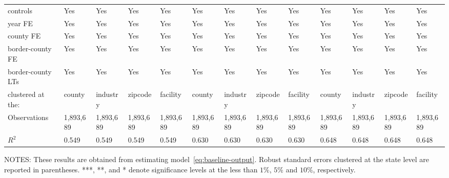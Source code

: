 \begin{table}[H]
{\begin{tabular}{@{}lllllllllllll@{}}
            controls                                                   & Yes       & Yes       & Yes       & Yes       & Yes       & Yes       & Yes       & Yes       & Yes       & Yes       & Yes       & Yes       \\
            year FE                                                    & Yes       & Yes       & Yes       & Yes       & Yes       & Yes       & Yes       & Yes       & Yes       & Yes       & Yes       & Yes       \\
            county FE                                                  & Yes       & Yes       & Yes       & Yes       & Yes       & Yes       & Yes       & Yes       & Yes       & Yes       & Yes       & Yes       \\
            border-county FE                                           & Yes       & Yes       & Yes       & Yes       & Yes       & Yes       & Yes       & Yes       & Yes       & Yes       & Yes       & Yes       \\
            border-county LTs                                          & Yes       & Yes       & Yes       & Yes       & Yes       & Yes       & Yes       & Yes       & Yes       & Yes       & Yes       & Yes       \\ \midrule
            clustered at the:                                          & county    & industry  & zipcode   & facility  & county    & industry  & zipcode   & facility  & county    & industry  & zipcode   & facility  \\
            Observations                                               & 1,893,689 & 1,893,689 & 1,893,689 & 1,893,689 & 1,893,689 & 1,893,689 & 1,893,689 & 1,893,689 & 1,893,689 & 1,893,689 & 1,893,689 & 1,893,689 \\
            $R^2$                                                      & 0.549     & 0.549     & 0.549     & 0.549     & 0.630     & 0.630     & 0.630     & 0.630     & 0.648     & 0.648     & 0.648     & 0.648     \\ \bottomrule\bottomrule
        \end{tabular}%
    }
    \begin{minipage}{\columnwidth}
        \vspace{0.05in}
        \tiny NOTES: These results are obtained from estimating model~\ref{eq:baseline-output}. Robust standard errors clustered at the state level are reported in parentheses. ***, **, and * denote significance levels at the less than $1\%$, $5\%$ and $10\%$, respectively.
    \end{minipage}
\end{table}